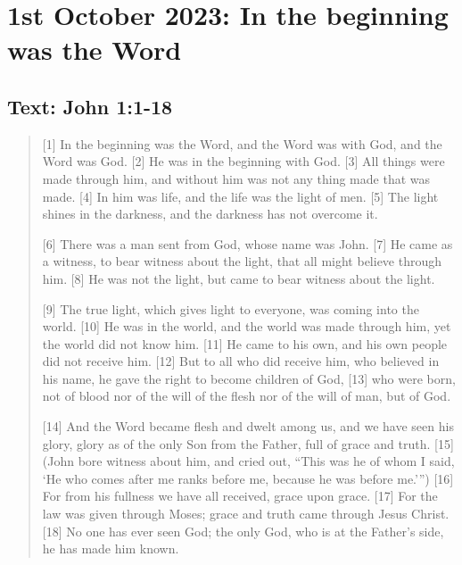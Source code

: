 \setcounter{figure}{0}

\section{1st October 2023: In the beginning was the Word}
\subsection*{Text: John 1:1-18}
  \begin{quote}
    [1] In the beginning was the Word, and the Word was with God, and the Word was God. [2] He was in the beginning with God. [3] All things were made through him, and without him was not any thing made that was made. [4] In him was life, and the life was the light of men. [5] The light shines in the darkness, and the darkness has not overcome it.

    [6] There was a man sent from God, whose name was John. [7] He came as a witness, to bear witness about the light, that all might believe through him. [8] He was not the light, but came to bear witness about the light.

    [9] The true light, which gives light to everyone, was coming into the world. [10] He was in the world, and the world was made through him, yet the world did not know him. [11] He came to his own, and his own people did not receive him. [12] But to all who did receive him, who believed in his name, he gave the right to become children of God, [13] who were born, not of blood nor of the will of the flesh nor of the will of man, but of God.

    [14] And the Word became flesh and dwelt among us, and we have seen his glory, glory as of the only Son from the Father, full of grace and truth. [15] (John bore witness about him, and cried out, “This was he of whom I said, ‘He who comes after me ranks before me, because he was before me.’”) [16] For from his fullness we have all received, grace upon grace. [17] For the law was given through Moses; grace and truth came through Jesus Christ. [18] No one has ever seen God; the only God, who is at the Father’s side, he has made him known.
  \end{quote}
